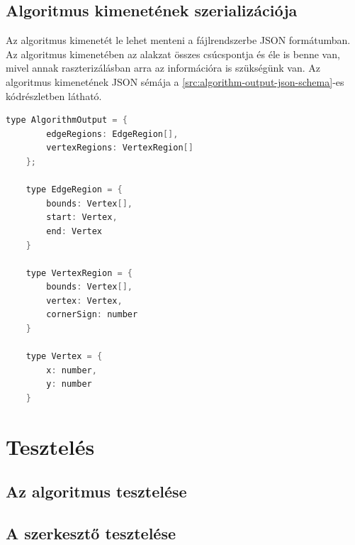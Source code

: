 \subsection{Algoritmus kimenetének szerializációja}
Az algoritmus kimenetét le lehet menteni a fájlrendszerbe JSON formátumban. Az algoritmus kimenetében az alakzat összes csúcspontja és éle is benne van, mivel annak raszterizálásban arra az információra is szükségünk van. Az algoritmus kimenetének JSON sémája a \ref{src:algorithm-output-json-schema}-es kódrészletben látható.

\begin{lstlisting}[language=C]
	type AlgorithmOutput = {
		edgeRegions: EdgeRegion[],
		vertexRegions: VertexRegion[]
	};

	type EdgeRegion = {
		bounds: Vertex[],
		start: Vertex,
		end: Vertex
	}

	type VertexRegion = {
		bounds: Vertex[],
		vertex: Vertex,
		cornerSign: number
	}

	type Vertex = {
		x: number,
		y: number
	}

\end{lstlisting}


\section{Tesztelés}

\subsection{Az algoritmus tesztelése}

\subsection{A szerkesztő tesztelése}
